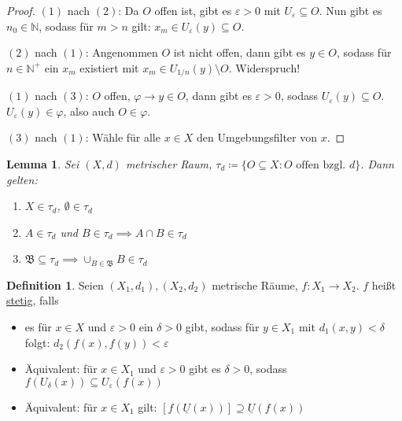 \documentclass[12pt]{scrartcl}%
\newtheorem{lemma}{Lemma}
\theoremstyle{definition}
\newtheorem*{defn}{Definition}
\theoremstyle{remark}
\begin{document}
\begin{proof}
    $(1)$ nach $(2)$: Da $O$ offen ist, gibt es $\varepsilon > 0$ mit $U_\varepsilon \subseteq O$. Nun gibt es $n_0\in\mathbb{N}$, sodass für $m > n$ gilt: $x_m \in U_\varepsilon(y)\subseteq O$.

    $(2)$ nach $(1)$: Angenommen $O$ ist nicht offen, dann gibt es $y\in O$, sodass für $n\in \mathbb{N}^+$ ein $x_m$ existiert mit $x_m\in U_{1/n}(y)\setminus O$. Widerspruch!

    $(1)$ nach $(3)$: $O$ offen, $\varphi \to y\in O$, dann gibt es $\varepsilon > 0$, sodass $U_\varepsilon(y) \subseteq O$. $U_\varepsilon(y)\in\varphi$, also auch $O\in\varphi$.

    $(3)$ nach $(1)$: Wähle für alle $x\in X$ den Umgebungsfilter von $x$.
\end{proof}

\begin{lemma}
    Sei $(X, d)$ metrischer Raum, $\tau_d\coloneqq \{O\subseteq X: O \text{ offen bzgl. } d\}$. Dann gelten:

    \begin{enumerate}[label=(\arabic*)]
        \item $X\in \tau_d$, $\emptyset\in \tau_d$
        \item $A\in \tau_d$ und $B\in \tau_d \implies A\cap B\in \tau_d$
        \item $\mathfrak{B} \subseteq \tau_d \implies \cup_{B\in\mathfrak{B}} B \in \tau_d$
    \end{enumerate}
\end{lemma}

\begin{defn}
    Seien $(X_1, d_1), (X_2, d_2)$ metrische Räume, $f: X_1\to X_2$. $f$ heißt \underline{stetig}, falls 
    
    \begin{itemize}
        \item es für $x\in X$ und $\varepsilon > 0$ ein $\delta > 0$ gibt, sodass für $y\in X_1$ mit $d_1(x,y) < \delta$ folgt: $d_2(f(x),f(y)) < \varepsilon$

        \item Äquivalent: für $x\in X_1$ und $\varepsilon > 0$ gibt es $\delta > 0$, sodass $f(U_\delta(x)) \subseteq U_\varepsilon(f(x))$

        \item Äquivalent: für $x\in X_1$ gilt: $[f(\underline{U}(x))] \supseteq \underline{U}(f(x))$
    \end{itemize}
\end{defn}
\end{document}
